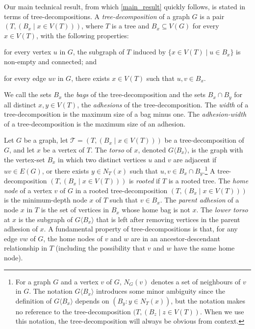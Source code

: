 \documentclass{patmorin}
\newcommand{\torso}[2]{{#1}\langle{#2}\rangle}
\newcommand{\defin}[1]{\emph{\textcolor{brightmaroon}{#1}}}
\newcommand{\calT}{\mathcal{T}}
\begin{document}
Our main technical result, from which \cref{main_result} quickly follows, is stated in terms of tree-decompositions.  A \defin{tree-decomposition} of a graph $G$ is a pair $(T,(B_x \mid x \in V(T)))$,
where $T$ is a tree and $B_x \subseteq V(G)$ for every $x \in V(T)$, with the
following properties:
\begin{enumerate*}[label=(\alph*)]
	\item for every vertex $u$ in $G$, the subgraph of $T$ induced by $\{x \in V(T) \mid u \in B_x\}$ is non-empty and connected; and
	\item for every edge $uv$ in $G$, there exists $x\in V(T)$ such that $u,v\in B_x$.
\end{enumerate*}
We call the sets $B_x$ the \defin{bags} of the tree-decomposition and the sets $B_x\cap B_y$ for all distinct $x,y\in V(T)$, the \defin{adhesions} of the tree-decomposition.
The \defin{width} of a tree-decomposition is the maximum size of a bag minus one.
The \defin{adhesion-width} of a tree-decomposition is the maximum size of an adhesion.

Let $G$ be a graph,
let $\calT=(T,(B_x \mid x\in V(T)))$ be a tree-decomposition of $G$, and let $x$ be a vertex of $T$.
The \defin{torso} of $x$, denoted \defin{$\torso{G}{B_x}$},
 is the graph with the vertex-set $B_x$ in which two distinct vertices $u$ and $v$ are adjacent
  if $uv \in E(G)$, or there exists $y \in N_T(x)$  such that $u,v \in B_x \cap B_y$.\footnote{For a graph $G$ and a vertex $v$ of $G$, $N_G(v)$ denotes a set of neighbours of $v$ in $G$. The notation $\torso{G}{B_x}$ introduces some minor ambiguity since the definition of $\torso{G}{B_x}$ depends on $(B_y:y\in N_T(x))$, but the notation makes no reference to the tree-decomposition $(T, (B_z\mid z\in V(T))$.  When we use this notation, the tree-decomposition will always be obvious from context.}
  A tree-decomposition $(T,(B_x \mid x\in V(T)))$ is \defin{rooted} if $T$ is a rooted tree.  The \defin{home node} of a vertex $v$ of $G$ in a rooted tree-decomposition $(T,(B_x \mid x\in V(T)))$ is the minimum-depth node $x$ of $T$ such that $v\in B_x$.  The \defin{parent adhesion} of a node $x$ in $T$ is the set of vertices in $B_x$ whose home bag is not $x$.  The \defin{lower torso} at $x$ is the subgraph of $\torso{G}{B_x}$ that is left after removing vertices in the parent adhesion of $x$. A fundamental property of tree-decompositions is that, for any edge $vw$ of $G$, the home nodes of $v$ and $w$ are in an ancestor-descendant relationship in $T$ (including the possibility that $v$ and $w$ have the same home node).
\end{document}
